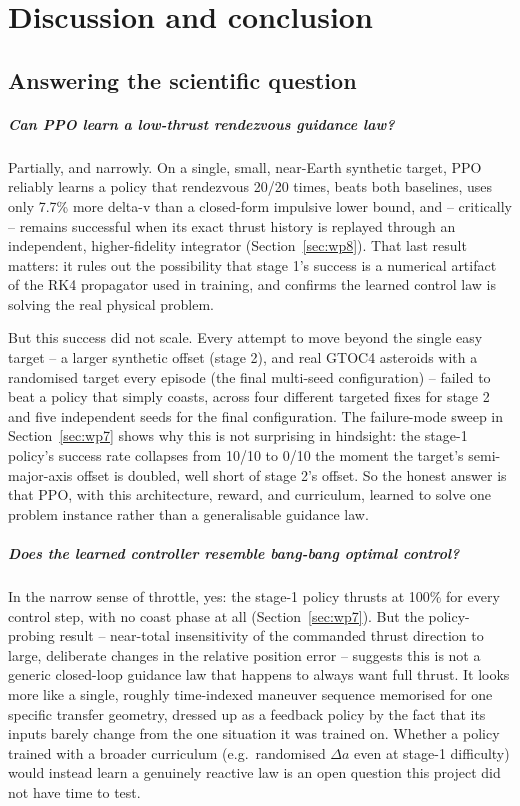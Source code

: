\chapter{Discussion and conclusion}
\label{chapter:discussion}

\section{Answering the scientific question}

\paragraph{Can PPO learn a low-thrust rendezvous guidance law?} Partially, and narrowly. On a
single, small, near-Earth synthetic target, PPO reliably learns a policy that rendezvous 20/20
times, beats both baselines, uses only 7.7\% more delta-v than a closed-form impulsive lower
bound, and -- critically -- remains successful when its exact thrust history is replayed through
an independent, higher-fidelity integrator (Section~\ref{sec:wp8}). That last result matters: it
rules out the possibility that stage 1's success is a numerical artifact of the RK4 propagator
used in training, and confirms the learned control law is solving the real physical problem.

But this success did not scale. Every attempt to move beyond the single easy target -- a larger
synthetic offset (stage 2), and real GTOC4 asteroids with a randomised target every episode (the
final multi-seed configuration) -- failed to beat a policy that simply coasts, across four
different targeted fixes for stage 2 and five independent seeds for the final configuration. The
failure-mode sweep in Section~\ref{sec:wp7} shows why this is not surprising in hindsight: the
stage-1 policy's success rate collapses from 10/10 to 0/10 the moment the target's semi-major-axis
offset is doubled, well short of stage 2's offset. So the honest answer is that PPO, with this
architecture, reward, and curriculum, learned to solve one problem instance rather than a
generalisable guidance law.

\paragraph{Does the learned controller resemble bang-bang optimal control?} In the narrow sense
of throttle, yes: the stage-1 policy thrusts at 100\% for every control step, with no coast phase
at all (Section~\ref{sec:wp7}). But the policy-probing result -- near-total insensitivity of the
commanded thrust direction to large, deliberate changes in the relative position error --
suggests this is not a generic closed-loop guidance law that happens to always want full thrust.
It looks more like a single, roughly time-indexed maneuver sequence memorised for one specific
transfer geometry, dressed up as a feedback policy by the fact that its inputs barely change from
the one situation it was trained on. Whether a policy trained with a broader curriculum (e.g.\
randomised $\Delta a$ even at stage-1 difficulty) would instead learn a genuinely reactive law is
an open question this project did not have time to test.

